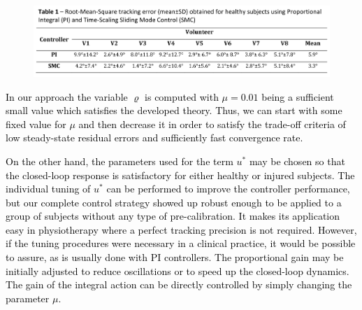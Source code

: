 \documentclass[review]{elsarticle}
\begin{document}
%
%
\begin{figure}[!h]
\hspace{-0.1\textwidth}
\includegraphics[width=1.2\textwidth]{Table1.png}
\label{table1}
\end{figure}





\textcolor{black}{In our approach the variable $\varrho$ is computed with $\mu=0.01$ being a sufficient small value  %
which satisfies the developed theory. Thus, we can start with some fixed value for $\mu$ and then decrease it in order to satisfy the trade-off criteria of low steady-state residual errors and sufficiently fast convergence rate.} 

\textcolor{black}{On the other hand, the parameters used for the term $u^*$ may be chosen so that the closed-loop response is satisfactory for either healthy or injured subjects. The individual tuning of $u^*$ can be performed to improve the controller performance, but our complete control strategy showed up robust enough to be applied to a group of subjects without any type of pre-calibration.  It makes \textcolor{black}{its application easy} in physiotherapy where a perfect tracking precision is not required. However, if the tuning procedures were necessary in a clinical practice, it would be possible to assure, as is usually done with PI controllers. The proportional gain may be initially adjusted to reduce oscillations or to speed up the closed-loop dynamics. The gain of the integral action can be directly controlled by simply changing the parameter $\mu$. }
\end{document}
